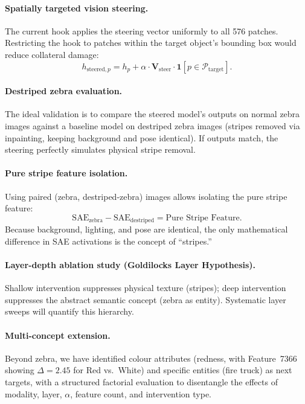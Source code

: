 \documentclass{article}
\begin{document}
\paragraph{Spatially targeted vision steering.}
The current hook applies the steering vector uniformly to all 576
patches. Restricting the hook to patches within the target object's
bounding box would reduce collateral damage:
\begin{equation}
  h_{\text{steered},p} = h_p + \alpha\cdot\mathbf{V}_{\text{steer}}
  \cdot\mathbf{1}[p \in \mathcal{P}_{\text{target}}].
\end{equation}

\paragraph{Destriped zebra evaluation.}
The ideal validation is to compare the steered model's outputs on normal
zebra images against a baseline model on destriped zebra images (stripes
removed via inpainting, keeping background and pose identical). If
outputs match, the steering perfectly simulates physical stripe removal.

\paragraph{Pure stripe feature isolation.}
Using paired (zebra, destriped-zebra) images allows isolating the pure
stripe feature:
\begin{equation}
  \text{SAE}_{\text{zebra}} - \text{SAE}_{\text{destriped}}
  = \text{Pure Stripe Feature}.
\end{equation}
Because background, lighting, and pose are identical, the only
mathematical difference in SAE activations is the concept of
``stripes.''

\paragraph{Layer-depth ablation study (Goldilocks Layer Hypothesis).}
Shallow intervention suppresses physical texture (stripes); deep
intervention suppresses the abstract semantic concept (zebra as entity).
Systematic layer sweeps will quantify this hierarchy.

\paragraph{Multi-concept extension.}
Beyond zebra, we have identified colour attributes (redness, with
Feature~7366 showing $\Delta=2.45$ for Red vs.\ White) and specific
entities (fire truck) as next targets, with a structured factorial
evaluation to disentangle the effects of modality, layer, $\alpha$,
feature count, and intervention type.
\end{document}
